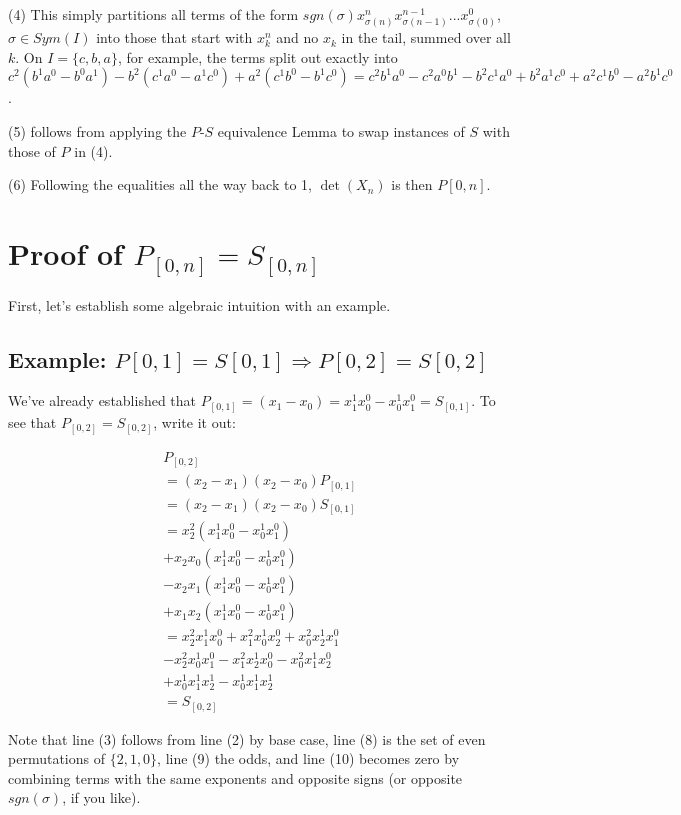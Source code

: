 \documentclass[11pt, oneside]{article} 	%
\begin{document}
(4) This simply partitions all terms of the form $sgn(\sigma) x_{\sigma(n)}^{n} x_{\sigma(n-1)}^{n-1} ... x_{\sigma(0)}^{0}$, $\sigma \in Sym(I)$ into those that start with $x_k^n$ and no $x_k$ in the tail, summed over all $k$.   On  $I = \{c,b,a\}$, for example, the terms split out exactly into $c^2(b^1a^0 - b^0a^1) - b^2(c^1a^0-a^1c^0) + a^2(c^1b^0-b^1c^0) = c^2b^1a^0 - c^2a^0b^1 - b^2c^1a^0 + b^2a^1c^0 + a^2c^1b^0 - a^2b^1c^0$.

(5) follows from applying the $P$-$S$ equivalence Lemma to swap instances of $S$ with those of $P$ in (4).

(6) Following the equalities all the way back to 1, $\det(X_n)$ is then $P[0,n]$.

\section{Proof of $P_{[0,n]} = S_{[0,n]}$}

First, let's establish some algebraic intuition with an example.

\subsection{Example: $P{[0,1]} = S{[0,1]} \Rightarrow P{[0,2]} = S{[0,2]}$}
We've already established that $P_{[0,1]} = (x_1 - x_0) =  x_1^1x_0^0 - x_0^1x_1^0 = S_{[0,1]}$.  To see that $P_{[0,2]} = S_{[0,2]}$, write it out:

\begin{align}
P_{[0,2]}  \\
= (x_2-x_1)(x_2-x_0)P_{[0,1]} \\
= (x_2-x_1)(x_2-x_0)S_{[0,1]} \\
= x_2^2(x_1^1x_0^0 - x_0^1x_1^0) \\
+ x_2x_0(x_1^1x_0^0 - x_0^1x_1^0) \\
- x_2x_1 (x_1^1x_0^0 - x_0^1x_1^0) \\
+ x_1x_2(x_1^1x_0^0 - x_0^1x_1^0)  \\
= x_2^2x_1^1x_0^0  + x_1^2x_0^1x_2^0 + x_0^2x_2^1x_1^0   \\
 - x_2^2x_0^1x_1^0 - x_1^2x_2^1x_0^0 - x_0^2x_1^1x_2^0 \\
+ x_0^1x_1^1x_2^1 - x_0^1x_1^1x_2^1 \\
= S_{[0,2]}
\end{align}

Note that line (3) follows from line (2) by base case, line (8) is the set of even permutations of $\{2,1,0\}$, line (9) the odds, and line (10) becomes zero by combining terms with the same exponents and opposite signs (or opposite $sgn(\sigma)$, if you like).
\end{document}
